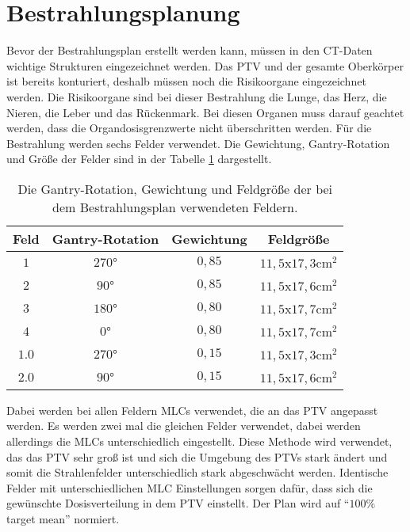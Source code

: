 \section{Bestrahlungsplanung}

Bevor der Bestrahlungsplan erstellt werden kann, müssen in den CT-Daten wichtige Strukturen eingezeichnet werden.
Das PTV und der gesamte Oberkörper ist bereits konturiert, deshalb müssen noch die Risikoorgane
eingezeichnet werden. Die Risikoorgane sind bei dieser Bestrahlung die Lunge, das Herz, die Nieren, die Leber und
das Rückenmark. Bei diesen Organen muss darauf geachtet werden, dass die Organdosisgrenzwerte nicht
überschritten werden. Für die Bestrahlung werden sechs Felder verwendet. Die Gewichtung, Gantry-Rotation
und Größe der Felder sind in der Tabelle \ref{tab:Felder} dargestellt.

\begin{table}
  \centering
  \caption{Die Gantry-Rotation, Gewichtung und Feldgröße der bei dem Bestrahlungsplan verwendeten Feldern.}
  \label{tab:Felder}
  \begin{tabular}{c c c c}
    \toprule
    Feld & Gantry-Rotation & Gewichtung & Feldgröße\\
    \midrule
    $1$   & $270°$ & $0,85$ & $11,5$x$17,3 \si{\centi\meter\squared}$ \\
    $2$   &  $90°$ & $0,85$ & $11,5$x$17,6 \si{\centi\meter\squared}$ \\
    $3$   & $180°$ & $0,80$ & $11,5$x$17,7 \si{\centi\meter\squared}$ \\
    $4$   &   $0°$ & $0,80$ & $11,5$x$17,7 \si{\centi\meter\squared}$ \\
    $1.0$ & $270°$ & $0,15$ & $11,5$x$17,3 \si{\centi\meter\squared}$ \\
    $2.0$ &  $90°$ & $0,15$ & $11,5$x$17,6 \si{\centi\meter\squared}$ \\
    \bottomrule
  \end{tabular}
\end{table}

Dabei werden bei allen Feldern MLCs verwendet, die an das PTV angepasst werden.
Es werden zwei mal die gleichen Felder verwendet, dabei werden allerdings die MLCs
unterschiedlich eingestellt. Diese Methode wird verwendet, das das PTV sehr groß ist und
sich die Umgebung des PTVs stark ändert und somit die Strahlenfelder unterschiedlich stark
abgeschwächt werden. Identische Felder mit unterschiedlichen MLC Einstellungen sorgen dafür, dass
sich die gewünschte Dosisverteilung in dem PTV einstellt.
Der Plan wird auf \enquote{$100\%$ target mean} normiert.
